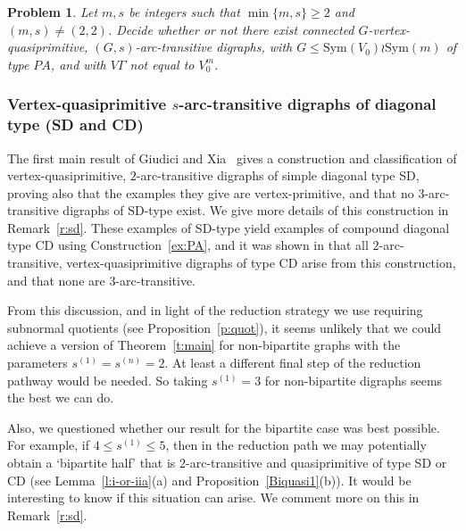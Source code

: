 \documentclass[11pt]{amsart}
\newtheorem{problem}{Problem}
\newcommand{\Sym}{\mathrm{Sym}}
\begin{document}
\begin{problem}\label{p2}
    Let $m, s$ be integers such that $\min\{m,s\}\geq2$ and $(m,s)\ne(2,2)$.  Decide whether or not there exist connected $G$-vertex-quasiprimitive, $(G,s)$-arc-transitive digraphs, with $G \leqslant \Sym(V_0)\wr \Sym(m)$ of type $PA$, and with $V\Gamma$ not equal to $V_0^m$.
\end{problem}

 

\subsubsection{ Vertex-quasiprimitive \(s\)-arc-transitive digraphs of diagonal type {\rm (SD and CD)}} \label{sub:SD}
The first main result of Giudici and Xia~\cite[Theorem 1.2]{quasi} gives a construction and classification of vertex-quasiprim\-it\-ive, \(2\)-arc-transitive digraphs of simple diagonal type SD, proving also that the examples they give are vertex-primitive, and that no $3$-arc-transitive digraphs of SD-type exist. We give more details of this construction in Remark~\ref{r:sd}. These examples of SD-type yield examples of compound diagonal type CD using Construction~\ref{ex:PA}, and it was shown in \cite[Corollary 1.4 ]{quasi} that all $2$-arc-transitive, vertex-quasiprimitive digraphs of type CD arise from this construction, and that none are $3$-arc-transitive. 

From this discussion, and in light of the reduction strategy we use requiring subnormal quotients (see Proposition~\ref{p:quot}), it seems unlikely that we could achieve a version of Theorem~\ref{t:main} for non-bipartite graphs with the parameters $s^{(1)}=s^{(n)}=2$. At least a different final step of the reduction pathway would be needed. So taking $s^{(1)}=3$ for non-bipartite digraphs seems the best we can do.



Also, we questioned whether our result for the bipartite case was best possible. For example, if \(4\leq s^{(1)}\leq5\), then in the reduction path we may potentially obtain a `bipartite half' that is  \(2\)-arc-transitive  and quasiprimitive of type SD or CD (see Lemma~\ref{l:i-or-iia}(a) and Proposition~\ref{Biquasi1}(b)).   It would be interesting to know if this situation can arise. We comment more on this  in Remark~\ref{r:sd}. 
\end{document}
